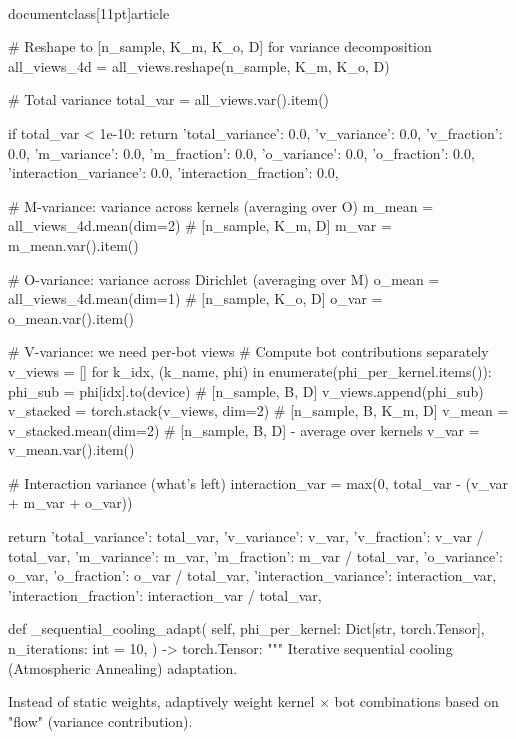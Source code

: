 \\documentclass[11pt]{article}
\begin{document}
\begin{CodeBlock}
{{{{{{{{        # Reshape to [n_sample, K_m, K_o, D] for variance decomposition
        all_views_4d = all_views.reshape(n_sample, K_m, K_o, D)
        
        # Total variance
        total_var = all_views.var().item()
        
        if total_var < 1e-10:
            return {
                'total_variance': 0.0,
                'v_variance': 0.0, 'v_fraction': 0.0,
                'm_variance': 0.0, 'm_fraction': 0.0,
                'o_variance': 0.0, 'o_fraction': 0.0,
                'interaction_variance': 0.0, 'interaction_fraction': 0.0,
            }
        
        # M-variance: variance across kernels (averaging over O)
        m_mean = all_views_4d.mean(dim=2)  # [n_sample, K_m, D]
        m_var = m_mean.var().item()
        
        # O-variance: variance across Dirichlet (averaging over M)
        o_mean = all_views_4d.mean(dim=1)  # [n_sample, K_o, D]
        o_var = o_mean.var().item()
        
        # V-variance: we need per-bot views
        # Compute bot contributions separately
        v_views = []
        for k_idx, (k_name, phi) in enumerate(phi_per_kernel.items()):
            phi_sub = phi[idx].to(device)  # [n_sample, B, D]
            v_views.append(phi_sub)
        v_stacked = torch.stack(v_views, dim=2)  # [n_sample, B, K_m, D]
        v_mean = v_stacked.mean(dim=2)  # [n_sample, B, D] - average over kernels
        v_var = v_mean.var().item()
        
        # Interaction variance (what's left)
        interaction_var = max(0, total_var - (v_var + m_var + o_var))
        
        return {
            'total_variance': total_var,
            'v_variance': v_var,
            'v_fraction': v_var / total_var,
            'm_variance': m_var,
            'm_fraction': m_var / total_var,
            'o_variance': o_var,
            'o_fraction': o_var / total_var,
            'interaction_variance': interaction_var,
            'interaction_fraction': interaction_var / total_var,
        }
    
    def _sequential_cooling_adapt(
        self,
        phi_per_kernel: Dict[str, torch.Tensor],
        n_iterations: int = 10,
    ) -> torch.Tensor:
        """
        Iterative sequential cooling (Atmospheric Annealing) adaptation.
        
        Instead of static weights, adaptively weight kernel × bot
        combinations based on "flow" (variance contribution).
        
}}}}}}}}
\end{CodeBlock}
\end{document}
